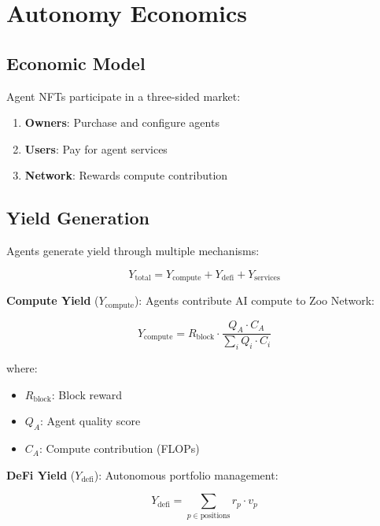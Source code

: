 \section{Autonomy Economics}

\label{sec:economics}

\subsection{Economic Model}

Agent NFTs participate in a three-sided market:

\begin{enumerate}
    \item \textbf{Owners}: Purchase and configure agents
    \item \textbf{Users}: Pay for agent services
    \item \textbf{Network}: Rewards compute contribution
\end{enumerate}

\subsection{Yield Generation}

Agents generate yield through multiple mechanisms:

\begin{equation}
Y_{\text{total}} = Y_{\text{compute}} + Y_{\text{defi}} + Y_{\text{services}}
\end{equation}

\textbf{Compute Yield} ($Y_{\text{compute}}$): Agents contribute AI compute to Zoo Network:

\begin{equation}
Y_{\text{compute}} = R_{\text{block}} \cdot \frac{Q_A \cdot C_A}{\sum_i Q_i \cdot C_i}
\end{equation}

where:
\begin{itemize}
    \item $R_{\text{block}}$: Block reward
    \item $Q_A$: Agent quality score
    \item $C_A$: Compute contribution (FLOPs)
\end{itemize}

\textbf{DeFi Yield} ($Y_{\text{defi}}$): Autonomous portfolio management:

\begin{equation}
Y_{\text{defi}} = \sum_{p \in \text{positions}} r_p \cdot v_p
\end{equation}


